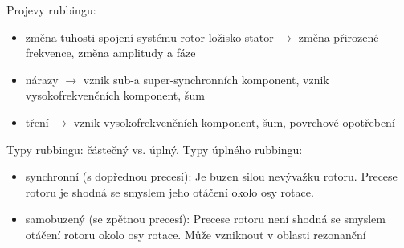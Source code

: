 Projevy rubbingu:
\begin{itemize}
\item změna tuhosti spojení systému rotor-ložisko-stator $ \to $ změna přirozené frekvence, změna amplitudy a fáze
\item nárazy $ \to $ vznik sub-a super-synchronních komponent, vznik vysokofrekvenčních komponent, šum
\item tření $ \to $ vznik vysokofrekvenčních komponent, šum, povrchové opotřebení
\end{itemize}
Typy rubbingu: částečný vs. úplný. Typy úplného rubbingu:
\begin{itemize}
\item synchronní (s dopřednou precesí): Je buzen silou nevývažku rotoru. Precese rotoru je shodná se smyslem jeho otáčení okolo osy rotace.
\item samobuzený (se zpětnou precesí): Precese rotoru není shodná se smyslem otáčení rotoru okolo osy rotace. Může vzniknout v oblasti rezonanční 
\end{itemize}

